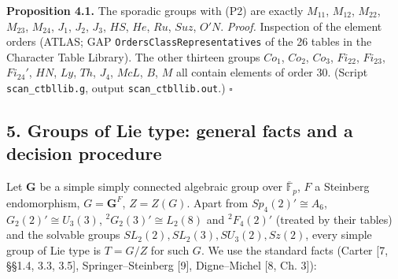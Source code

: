 \documentclass[11pt,a4paper]{article}
\begin{document}
\textbf{Proposition 4.1.} The sporadic groups with (P2) are exactly
\(M_{11}\), \(M_{12}\), \(M_{22}\), \(M_{23}\), \(M_{24}\), \(J_1\),
\(J_2\), \(J_3\), \(HS\), \(He\), \(Ru\), \(Suz\), \(O'N\).
\emph{Proof.} Inspection of the element orders (ATLAS; GAP
\texttt{OrdersClassRepresentatives} of the 26 tables in the Character
Table Library). The other thirteen groups \(Co_1\), \(Co_2\), \(Co_3\),
\(Fi_{22}\), \(Fi_{23}\), \(Fi_{24}'\), \(HN\), \(Ly\), \(Th\), \(J_4\),
\(McL\), \(B\), \(M\) all contain elements of order \(30\). (Script
\texttt{scan\_ctbllib.g}, output \texttt{scan\_ctbllib.out}.)
\(\square\)

\subsection{5. Groups of Lie type: general facts and a decision
procedure}\label{groups-of-lie-type-general-facts-and-a-decision-procedure}

Let \(\mathbf G\) be a simple simply connected algebraic group over
\(\overline{\mathbb F}_p\), \(F\) a Steinberg endomorphism,
\(G=\mathbf G^F\), \(Z=Z(G)\). Apart from \(Sp_4(2)'\cong A_6\),
\(G_2(2)'\cong U_3(3)\), \({}^2G_2(3)'\cong L_2(8)\) and \({}^2F_4(2)'\)
(treated by their tables) and the solvable groups
\(SL_2(2),SL_2(3),SU_3(2),Sz(2)\), every simple group of Lie type is
\(T=G/Z\) for such \(G\). We use the standard facts (Carter {[}7, §§1.4,
3.3, 3.5{]}, Springer--Steinberg {[}9{]}, Digne--Michel {[}8, Ch. 3{]}):
\end{document}
